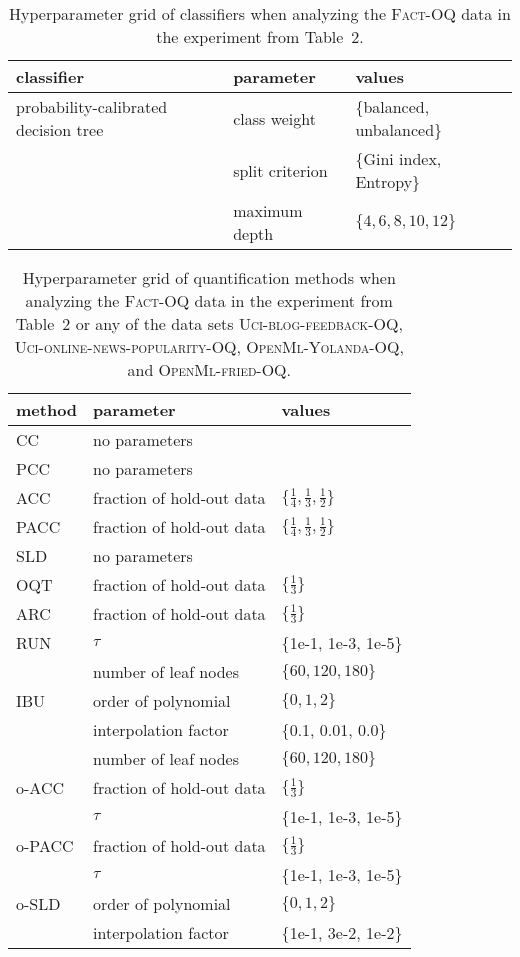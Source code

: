 \documentclass[10pt,a4paper]{article}
\begin{document}
\begin{table}
 \centering
 \caption{Hyperparameter grid of classifiers when analyzing the
 \textsc{Fact-OQ} data in the experiment from Table~2.}
 \label{tab:hyperparameter-fact-classifier}
 \footnotesize
 \begin{tabular}{lll}
 \toprule
 classifier & parameter & values \\
 \midrule
 probability-calibrated decision tree & class weight & \{balanced, unbalanced\} \\
 & split criterion & \{Gini index, Entropy\} \\
 & maximum depth & $\{4, 6, 8, 10, 12\}$ \\
 \bottomrule
 \end{tabular}
\end{table}

\begin{table}
 \centering
 \caption{Hyperparameter grid of quantification methods when
 analyzing the \textsc{Fact-OQ} data in the experiment from Table~2 or
 any of the data sets \textsc{Uci-blog-feedback-OQ},
 \textsc{Uci-online-news-popularity-OQ}, \textsc{OpenMl-Yolanda-OQ},
 and \textsc{OpenMl-fried-OQ}.}
 \label{tab:hyperparameter-fact-quantifier}
 \footnotesize
 \begin{tabular}{lll}
 \toprule
 method & parameter & values \\
 \midrule
 CC & no parameters & \\
 PCC & no parameters & \\
 ACC & fraction of hold-out data & $\{\frac{1}{4}, \frac{1}{3}, \frac{1}{2}\}$ \\
 PACC & fraction of hold-out data & $\{\frac{1}{4}, \frac{1}{3}, \frac{1}{2}\}$ \\
 SLD & no parameters & \\
 \midrule
 OQT & fraction of hold-out data & $\{\frac{1}{3}\}$ \\
 ARC & fraction of hold-out data & $\{\frac{1}{3}\}$ \\
 RUN & $\tau$ & $\{$1e-1, 1e-3, 1e-5$\}$ \\
 & number of leaf nodes & $\{60, 120, 180\}$ \\
 IBU & order of polynomial & $\{0, 1, 2\}$ \\
 & interpolation factor & $\{$0.1, 0.01, 0.0$\}$ \\
 & number of leaf nodes & $\{60, 120, 180\}$ \\
 \midrule
 o-ACC & fraction of hold-out data & $\{\frac{1}{3}\}$ \\
 & $\tau$ & $\{$1e-1, 1e-3, 1e-5$\}$ \\
 o-PACC & fraction of hold-out data & $\{\frac{1}{3}\}$ \\
 & $\tau$ & $\{$1e-1, 1e-3, 1e-5$\}$ \\
 o-SLD & order of polynomial & $\{0, 1, 2\}$ \\
 & interpolation factor & $\{$1e-1, 3e-2, 1e-2$\}$ \\
 \bottomrule
 \end{tabular}
\end{table}
\end{document}
